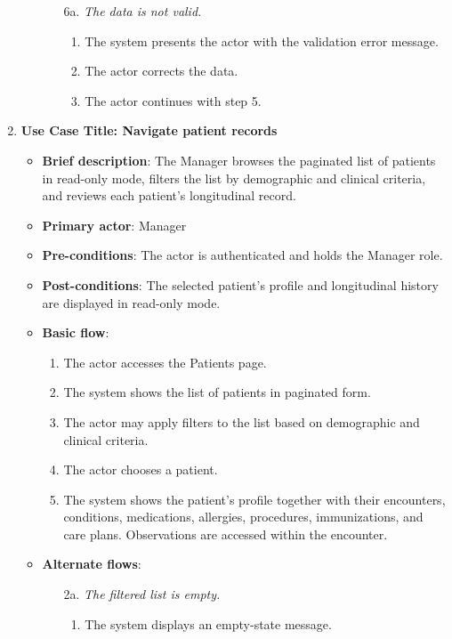 \begin{enumerate}
\begin{itemize}
\begin{itemize}
\begin{enumerate}
        \end{enumerate}
        \item[6a.] \textit{The data is not valid.}
        \begin{enumerate}
            \item The system presents the actor with the validation error message.
            \item The actor corrects the data.
            \item The actor continues with step 5.
        \end{enumerate}
    \end{itemize}
\end{itemize}

\vspace{0.5em}

\item \textbf{Use Case Title: Navigate patient records}
\begin{itemize}
    \item \textbf{Brief description}: The Manager browses the paginated list of patients in read-only mode, filters the list by demographic and clinical criteria, and reviews each patient's longitudinal record.
    \item \textbf{Primary actor}: Manager
    \item \textbf{Pre-conditions}: The actor is authenticated and holds the Manager role.
    \item \textbf{Post-conditions}: The selected patient's profile and longitudinal history are displayed in read-only mode.
    \item \textbf{Basic flow}:
    \begin{enumerate}
        \item The actor accesses the Patients page.
        \item The system shows the list of patients in paginated form.
        \item The actor may apply filters to the list based on demographic and clinical criteria.
        \item The actor chooses a patient.
        \item The system shows the patient's profile together with their encounters, conditions, medications, allergies, procedures, immunizations, and care plans. Observations are accessed within the encounter.
    \end{enumerate}
    \item \textbf{Alternate flows}:
    \begin{itemize}
        \item[2a.] \textit{The filtered list is empty.}
        \begin{enumerate}
            \item The system displays an empty-state message.
        \end{enumerate}
    \end{itemize}
\end{itemize}


\end{enumerate}
